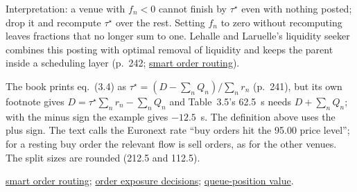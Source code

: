 \begin{qfmethod}
 Interpretation: a venue with $f_n<0$ cannot finish by $\tau^\star$ even with nothing posted; drop it and recompute $\tau^\star$ over the rest. Setting $f_n$ to zero without recomputing leaves fractions that no longer sum to one. Lehalle and Laruelle's liquidity seeker combines this posting with optimal removal of liquidity and keeps the parent inside a scheduling layer (p.~242; \hyperref[def:smart-order-routing]{smart order routing}).

 The book prints eq.~(3.4) as $\tau^\star=(D-\sum_nQ_n)/\sum_nr_n$ (p.~241), but its own footnote gives $D=\tau^\star\sum_nr_n-\sum_nQ_n$ and Table~3.5's 62.5~s needs $D+\sum_nQ_n$; with the minus sign the example gives $-12.5$~s. The definition above uses the plus sign. The text calls the Euronext rate ``buy orders hit the 95.00 price level''; for a resting buy order the relevant flow is sell orders, as for the other venues. The split sizes are rounded (212.5 and 112.5).

 \hyperref[def:smart-order-routing]{smart order routing}; \hyperref[def:order-exposure-decisions]{order exposure decisions}; \hyperref[res:queue-position-value]{queue-position value}.

\end{qfmethod}

